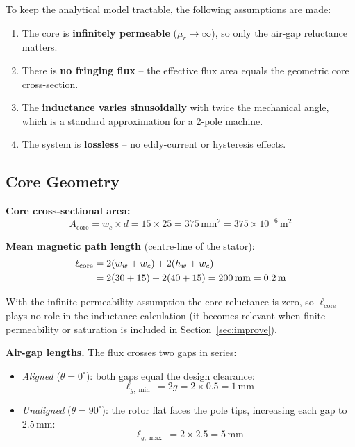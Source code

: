 \documentclass[12pt,a4paper]{article}
\newcommand{\unit}[1]{\,\mathrm{#1}}
\begin{document}
To keep the analytical model tractable, the following assumptions are made:

\begin{enumerate}[label=\alph*)]
  \item The core is \textbf{infinitely permeable} ($\mu_r \to \infty$),
        so only the air-gap reluctance matters.
  \item There is \textbf{no fringing flux} -- the effective flux area
        equals the geometric core cross-section.
  \item The \textbf{inductance varies sinusoidally} with twice the
        mechanical angle, which is a standard approximation for a 2-pole
        machine.
  \item The system is \textbf{lossless} -- no eddy-current or hysteresis
        effects.
\end{enumerate}

\subsection{Core Geometry}

\textbf{Core cross-sectional area:}
\begin{equation}
  A_{\mathrm{core}} = w_c \times d = 15 \times 25 = 375\unit{mm^2}
  = 375 \times 10^{-6}\unit{m^2}
\end{equation}

\textbf{Mean magnetic path length} (centre-line of the stator):
\begin{align}
  \ell_{\mathrm{core}}
    &= 2(w_w + w_c) + 2(h_w + w_c) \notag \\
    &= 2(30+15) + 2(40+15) = 200\unit{mm} = 0.2\unit{m}
\end{align}

With the infinite-permeability assumption the core reluctance is zero,
so $\ell_{\mathrm{core}}$ plays no role in the inductance calculation
(it becomes relevant when finite permeability or saturation is
included in Section~\ref{sec:improve}).

\textbf{Air-gap lengths.} The flux crosses two gaps in series:

\begin{itemize}
  \item \emph{Aligned} ($\theta = 0^{\circ}$): both gaps equal the
        design clearance:
        \[
          \ell_{g,\min} = 2g = 2 \times 0.5 = 1\unit{mm}
        \]
  \item \emph{Unaligned} ($\theta = 90^{\circ}$): the rotor flat
        faces the pole tips, increasing each gap to $2.5\unit{mm}$:
        \[
          \ell_{g,\max} = 2 \times 2.5 = 5\unit{mm}
        \]
\end{itemize}
\end{document}
